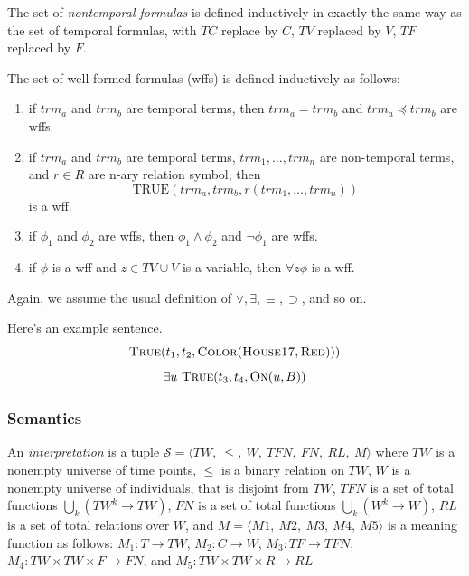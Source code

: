 The set of \textit{nontemporal formulas} is defined inductively in exactly the same way as the set of temporal formulas, with
$TC$ replace by $C$, $TV$ replaced by $V$, $TF$ replaced by $F$.

The set of well-formed formulas (wffs) is defined inductively as follows:
\begin{enumerate}
	\item if $trm_a$ and $trm_b$ are temporal terms, then $trm_a = trm_b$ and $trm_a \preceq trm_b$ are wffs.
	\item if $trm_a$ and $trm_b$ are temporal terms, $trm_1, \dots, trm_n$ are non-temporal terms, and $r \in R$ are n-ary relation symbol,
	      then
	      \[
		      \text{TRUE}(trm_a, trm_b, r(trm_1, \dots, trm_n))
	      \]
	      is a wff.
	\item if $\phi_1$ and $\phi_2$ are wffs, then $\phi_1 \land \phi_2$ and $\neg \phi_1$ are wffs.
	\item if $\phi$ is a wff and $z \in TV \cup V$ is a variable, then $\forall z \phi$ is a wff.
\end{enumerate}

Again, we assume the usual definition of $\lor, \exists, \equiv, \supset$, and so on.

\begin{exmp} Here's an example sentence.
	\begin{equation}
		\textsc{True}(t_1, t_2, \textsc{Color}(\textsc{House17}, \textsc{Red})))
	\end{equation}
	\begin{equation}
		\exists u \ \textsc{True}(t_3, t_4, \textsc{On}(u,B))
	\end{equation}
\end{exmp}

\subsubsection{Semantics}
An \textit{interpretation} is a tuple $\mathscr{S} = \langle  TW,\ \leqslant,\ W,\ TFN,\ FN,\ RL,\ M\rangle$ where $TW$
is a nonempty universe of time points, $\leqslant$ is a binary relation on $TW$, $W$ is a nonempty universe of individuals,
that is disjoint from $TW$, $TFN$ is a set of total functions $\bigcup_k (TW^k \rightarrow TW)$,
$FN$ is a set of total functions $ \bigcup_k (W^k \rightarrow W)$, $RL$ is a set of total relations over $W$, and
$M = \langle M1,\ M2,\ M3,\ M4,\ M5 \rangle$ is a meaning function as follows: $M_1 : T \rightarrow TW$,
$M_2: C \to W$, $M_3 : TF \to TFN$, $M_4 : TW \times TW \times F \to FN$, and $M_5: TW \times TW \times R \to RL$

